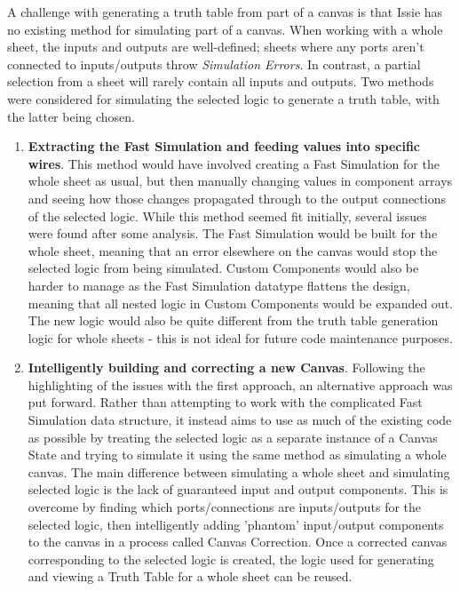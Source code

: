 A challenge with generating a truth table from part of a canvas is that Issie has no existing method for simulating part of a canvas. When working with a whole sheet, the inputs and outputs are well-defined; sheets where any ports aren't connected to inputs/outputs throw \textit{Simulation Errors}. In contrast, a partial selection from a sheet will rarely contain all inputs and outputs. Two methods were considered for simulating the selected logic to generate a truth table, with the latter being chosen.
\begin{enumerate}
    \item \textbf{Extracting the Fast Simulation and feeding values into specific wires}. This method would have involved creating a Fast Simulation for the whole sheet as usual, but then manually changing values in component arrays and seeing how those changes propagated through to the output connections of the selected logic. While this method seemed fit initially, several issues were found after some analysis. The Fast Simulation would be built for the whole sheet, meaning that an error elsewhere on the canvas would stop the selected logic from being simulated. Custom Components would also be harder to manage as the Fast Simulation datatype flattens the design, meaning that all nested logic in Custom Components would be expanded out. The new logic would also be quite different from the truth table generation logic for whole sheets - this is not ideal for future code maintenance purposes.
    \item \textbf{Intelligently building and correcting a new Canvas}. Following the highlighting of the issues with the first approach, an alternative approach was put forward. Rather than attempting to work with the complicated Fast Simulation data structure, it instead aims to use as much of the existing code as possible by treating the selected logic as a separate instance of a Canvas State and trying to simulate it using the same method as simulating a whole canvas. The main difference between simulating a whole sheet and simulating selected logic is the lack of guaranteed input and output components. This is overcome by finding which ports/connections are inputs/outputs for the selected logic, then intelligently adding 'phantom' input/output components to the canvas in a process called Canvas Correction. Once a corrected canvas corresponding to the selected logic is created, the logic used for generating and viewing a Truth Table for a whole sheet can be reused.
\end{enumerate}

